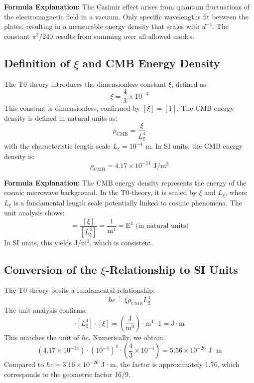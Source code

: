 \documentclass[12pt,a4paper]{report}
\begin{document}
	\textbf{Formula Explanation:} The Casimir effect arises from quantum fluctuations of the electromagnetic field in a vacuum. Only specific wavelengths fit between the plates, resulting in a measurable energy density that scales with $d^{-4}$. The constant $\pi^2/240$ results from summing over all allowed modes.
	
	\subsection{Definition of $\xi$ and CMB Energy Density}
	The T0-theory introduces the dimensionless constant $\xi$, defined as:
	\begin{equation}
		\xi = \frac{4}{3} \times 10^{-4}
	\end{equation}
	This constant is dimensionless, confirmed by $[\xi] = [1]$. The CMB energy density is defined in natural units as:
	\begin{equation}
		\rho_{\text{CMB}} = \frac{\xi}{L_\xi^4}
	\end{equation}
	with the characteristic length scale $L_\xi = 10^{-4}$ m. In SI units, the CMB energy density is:
	\begin{equation}
		\rho_{\text{CMB}} = 4.17 \times 10^{-14} \text{ J}/\text{m}^3
	\end{equation}
	
	\textbf{Formula Explanation:} The CMB energy density represents the energy of the cosmic microwave background. In the T0-theory, it is scaled by $\xi$ and $L_\xi$, where $L_\xi$ is a fundamental length scale potentially linked to cosmic phenomena. The unit analysis shows:
	\begin{equation}
		[\rho_{\text{CMB}}] = \frac{[\xi]}{[L_\xi^4]} = \frac{1}{\text{m}^4} = \text{E}^4 \text{ (in natural units)}
	\end{equation}
	In SI units, this yields J/m$^3$, which is consistent.
	
	\subsection{Conversion of the $\xi$-Relationship to SI Units}
	The T0-theory posits a fundamental relationship:
	\begin{equation}
		\hbar c \stackrel{!}{=} \xi \rho_{\text{CMB}} L_\xi^4
	\end{equation}
	The unit analysis confirms:
	\begin{equation}
		[\rho_{\text{CMB}}] \cdot [L_\xi^4] \cdot [\xi] = \left( \frac{\text{J}}{\text{m}^3} \right) \cdot \text{m}^4 \cdot 1 = \text{J} \cdot \text{m}
	\end{equation}
	This matches the unit of $\hbar c$. Numerically, we obtain:
	\begin{equation}
		\left( 4.17 \times 10^{-14} \right) \cdot \left( 10^{-4} \right)^4 \cdot \left( \frac{4}{3} \times 10^{-4} \right) = 5.56 \times 10^{-26} \text{ J} \cdot \text{m}
	\end{equation}
	Compared to $\hbar c = 3.16 \times 10^{-26}$ J·m, the factor is approximately 1.76, which corresponds to the geometric factor 16/9.
	
\end{document}
